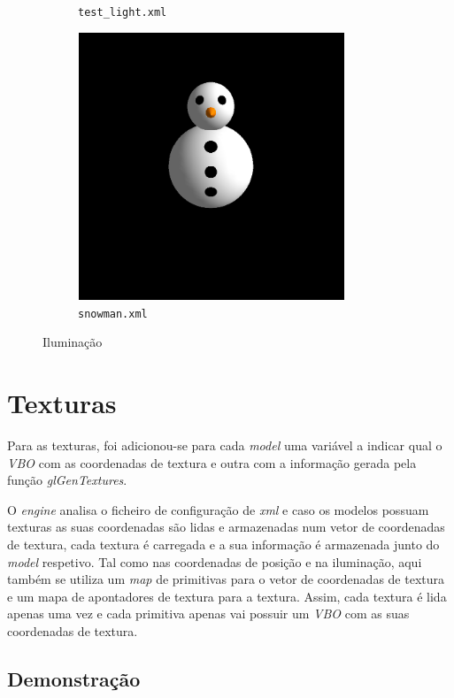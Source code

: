 \documentclass[11pt,a4paper]{report}
\begin{document}
\begin{figure}[H]
\begin{subfigure}{0.5\textwidth}
  \caption{\texttt{test\_light.xml}}
  \label{fig:test_light}
\end{subfigure}%
\begin{subfigure}{0.5\textwidth}
  \centering
  \includegraphics[width = 8cm,height = 8cm]{snowman.png}
  \caption{\texttt{snowman.xml}}
  \label{fig:snowman}
\end{subfigure}
\caption{Iluminação}
\end{figure}

\newpage
\section{Texturas}
Para as texturas, foi adicionou-se para cada \textit{model} uma variável a indicar qual o \textit{VBO} com as coordenadas de textura e outra com a informação gerada pela função \textit{glGenTextures}.

O \textit{engine} analisa o ficheiro de configuração de \textit{xml} e caso os modelos possuam texturas as suas coordenadas são lidas e armazenadas num vetor de coordenadas de textura, cada textura é carregada e a sua informação é armazenada junto do \textit{model} respetivo.
Tal como nas coordenadas de posição e na iluminação, aqui também se utiliza um \textit{map} de primitivas para o vetor de coordenadas de textura e um mapa de apontadores de textura para a textura. Assim, cada textura é lida apenas uma vez e cada primitiva apenas vai possuir um \textit{VBO} com as suas coordenadas de textura.

\subsection{Demonstração}
\end{document}
